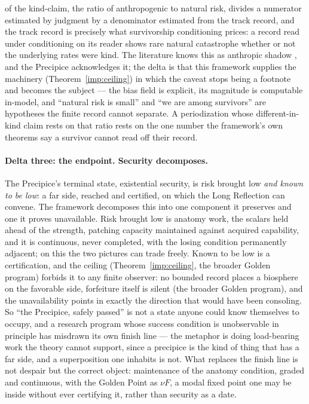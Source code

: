 of the kind-claim, the ratio of anthropogenic to natural risk, divides a numerator estimated by judgment by a denominator estimated
from the track record, and the track record is precisely what
survivorship conditioning prices: a record read under conditioning on
its reader shows rare natural catastrophe whether or not the
underlying rates were kind. The literature knows this as anthropic
shadow \cite{CSB10}, and the Precipice acknowledges it; the delta is
that this framework supplies the machinery
(Theorem~\ref{imp:ceiling}) in which the caveat stops being a footnote and
becomes the subject --- the bias field is explicit, its magnitude is
computable in-model, and ``natural risk is small'' and ``we are among
survivors'' are hypotheses the finite record cannot separate. A
periodization whose different-in-kind claim rests on that ratio rests
on the one number the framework's own theorems say a survivor cannot
read off their record.

\paragraph{Delta three: the endpoint. Security decomposes.} The
Precipice's terminal state, existential security, is risk
brought low \emph{and known to be low}: a far side, reached and
certified, on which the Long Reflection can convene. The framework
decomposes this into one component it preserves and one it proves
unavailable. Risk brought low is anatomy work, the scalars held
ahead of the strength, patching capacity maintained against acquired capability, and it is continuous, never completed, with the losing condition
permanently adjacent; on this the two pictures can trade freely.
Known to be low is a certification, and the ceiling
(Theorem~\ref{imp:ceiling}, the broader Golden program)
forbids it to any finite observer: no bounded record places a
biosphere on the favorable side, forfeiture itself is silent
(the broader Golden program), and the unavailability points in
exactly the direction that would have been consoling. So ``the
Precipice, safely passed'' is not a state anyone could know themselves
to occupy, and a research program whose success condition is
unobservable in principle has misdrawn its own finish line --- the
metaphor is doing load-bearing work the theory cannot support, since a
precipice is the kind of thing that has a far side, and a
superposition one inhabits is not. What replaces the finish line is
not despair but the correct object: maintenance of the anatomy
condition, graded and continuous, with the Golden Point as
$\nu F$, a modal fixed point one may be inside without ever
certifying it, rather than security as a date.

